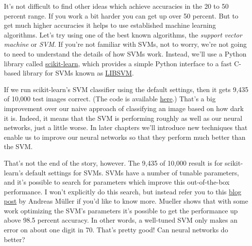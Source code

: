 \documentclass[a4paper,twoside,10pt]{book}
\begin{document}
It's not difficult to find other ideas which achieve accuracies in the 20 to 50 percent range. If you work a bit harder you can get up over 50 percent. But to get much higher accuracies it helps to use established machine learning algorithms. Let's try using one of the best known algorithms, the \textit{support vector machine} or \textit{SVM}. If you're not familiar with SVMs, not to worry, we're not going to need to understand the details of how SVMs work. Instead, we'll use a Python library called \href{http://scikit-learn.org/stable/}{scikit-learn}, which provides a simple Python interface to a fast C-based library for SVMs known as \href{http://www.csie.ntu.edu.tw/~cjlin/libsvm/}{LIBSVM}.

If we run scikit-learn's SVM classifier using the default settings, then it gets 9,435 of 10,000 test images correct. (The code is available \href{https://github.com/mnielsen/neural-networks-and-deep-learning/blob/master/src/mnist_svm.py}{here}.) That's a big improvement over our naive approach of classifying an image based on how dark it is. Indeed, it means that the SVM is performing roughly as well as our neural networks, just a little worse. In later chapters we'll introduce new techniques that enable us to improve our neural networks so that they perform much better than the SVM.

That's not the end of the story, however. The 9,435 of 10,000 result is for scikit-learn's default settings for SVMs. SVMs have a number of tunable parameters, and it's possible to search for parameters which improve this out-of-the-box performance. I won't explicitly do this search, but instead refer you to this \href{http://peekaboo-vision.blogspot.de/2010/09/mnist-for-ever.html}{blog post} by Andreas M\"{u}ller if you'd like to know more. Mueller shows that with some work optimizing the SVM's parameters it's possible to get the performance up above 98.5 percent accuracy. In other words, a well-tuned SVM only makes an error on about one digit in 70. That's pretty good! Can neural networks do better?
\end{document}
